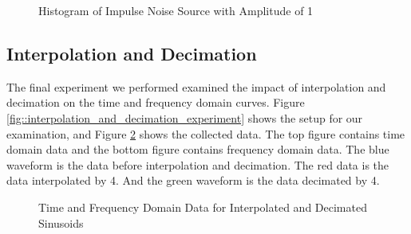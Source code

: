 \documentclass{article}
\begin{document}
\begin{figure}[H]
	\centerline{}
	\caption{Histogram of Impulse Noise Source with Amplitude of 1}
	\label{fig::impulse_noise_histogram}
\end{figure}

\subsection{Interpolation and Decimation}

The final experiment we performed examined the impact of interpolation and decimation on the time and frequency domain curves. Figure \ref{fig::interpolation_and_decimation_experiment} shows the setup for our examination, and Figure \ref{fig::interpolation_and_decimation_waveforms} shows the collected data. The top figure contains time domain data and the bottom figure contains frequency domain data. The blue waveform is the data before interpolation and decimation. The red data is the data interpolated by 4. And the green waveform is the data decimated by 4.

\begin{figure}[H]
	\centerline{}
	\caption{Time and Frequency Domain Data for Interpolated and Decimated Sinusoids}
	\label{fig::interpolation_and_decimation_waveforms}
\end{figure}
\end{document}
